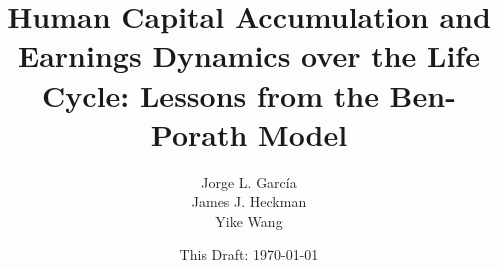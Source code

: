 \documentclass[12pt]{article}
\begin{document}
\title{Human Capital Accumulation and Earnings Dynamics over the Life Cycle: Lessons from the Ben-Porath Model}
\author{Jorge L. Garc\'{i}a \\ James J. Heckman \\ Yike Wang}
\date{This Draft: \today}
\maketitle
\clearpage




\clearpage


\end{document}
